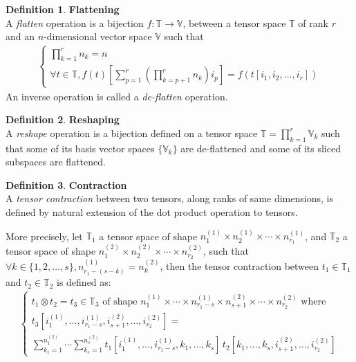 \documentclass{article}
\theoremstyle{definition}
\newtheorem{definition}{Definition}[section]
\newcommand{\tspace}{\mathbb{T}}
\newcommand{\vecspace}{\mathbb{V}}
\begin{document}
\begin{definition}\textbf{Flattening}\\
A \emph{flatten} operation is a bijection $f: \tspace \rightarrow \vecspace$, between a tensor space $\tspace$ of rank $r$ and an $n$-dimensional vector space $\vecspace$ such that
\begin{gather*}
\left\{
  \begin{array}{l}
  \displaystyle \prod_{k=1}^r n_k = n \\
  \forall t \in \tspace, f(t)[\displaystyle \sum_{p=1}^r \left( \prod_{k=p+1}^r n_k \right) i_p ] = f(t[i_1, i_2, \ldots, i_r])
  \end{array}
\right.
\end{gather*}
An inverse operation is called a \emph{de-flatten} operation.
\end{definition}

\begin{definition}\textbf{Reshaping}\\
A \emph{reshape} operation is a bijection defined on a tensor space $\tspace = \displaystyle \prod_{k=1}^r \vecspace_k$ such that some of its basis vector spaces $\{\vecspace_k\}$ are de-flattened and some of its sliced subspaces are flattened.
\end{definition}

\begin{definition}\textbf{Contraction}\\
A \emph{tensor contraction} between two tensors, along ranks of same dimensions, is defined by natural extension of the dot product operation to tensors.

More precisely, let $\tspace_1$ a tensor space of shape $n_1^{(1)} \times n_2^{(1)} \times \cdots \times n_{r_1}^{(1)}$, and $\tspace_2$ a tensor space of shape $n_1^{(2)} \times n_2^{(2)} \times \cdots \times n_{r_2}^{(2)}$, such that $\forall k \in \{1, 2, \ldots, s\}, n_{r_1-(s-k)}^{(1)} = n_k^{(2)}$, then the tensor contraction between $t_1 \in \tspace_1$ and $t_2 \in \tspace_2$ is defined as:
\begin{gather*}
\left\{
  \begin{array}{l}
    t_1 \otimes t_2 = t_3 \in \tspace_3 \text{ of shape } n_1^{(1)} \times \cdots \times n_{r_1-s}^{(1)} \times n_{s+1}^{(2)} \times \cdots \times n_{r_2}^{(2)}
    \text{ where} \\
    t_3[i_1^{(1)}, \ldots, i_{r_1-s}^{(1)}, i_{s+1}^{(2)}, \ldots, i_{r_2}^{(2)}] = \\
    \displaystyle \sum_{k_1=1}^{n_1^{(2)}} \cdots \sum_{k_s=1}^{n_s^{(2)}}
    t_1[i_1^{(1)}, \ldots, i_{r_1-s}^{(1)}, k_1, \ldots, k_s] \hspace{2pt}
    t_2[k_1, \ldots, k_s, i_{s+1}^{(2)}, \ldots, i_{r_2}^{(2)}]
  \end{array}
\right.
\end{gather*}
\end{definition}
\end{document}
